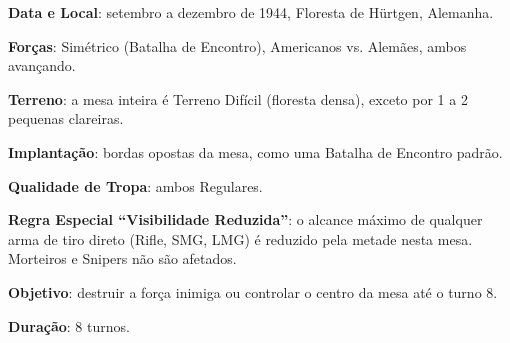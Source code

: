 \documentclass[11pt]{article}
\begin{document}
\textbf{Data e Local}: setembro a dezembro de 1944, Floresta de Hürtgen, Alemanha.

\textbf{Forças}: Simétrico (Batalha de Encontro), Americanos vs. Alemães, ambos avançando.

\textbf{Terreno}: a mesa inteira é Terreno Difícil (floresta densa), exceto por 1 a 2 pequenas clareiras.

\textbf{Implantação}: bordas opostas da mesa, como uma Batalha de Encontro padrão.

\textbf{Qualidade de Tropa}: ambos Regulares.

\textbf{Regra Especial ``Visibilidade Reduzida''}: o alcance máximo de qualquer arma de tiro direto (Rifle, SMG, LMG) é reduzido pela metade nesta mesa. Morteiros e Snipers não são afetados.

\textbf{Objetivo}: destruir a força inimiga ou controlar o centro da mesa até o turno 8.

\textbf{Duração}: 8 turnos.
\end{document}
